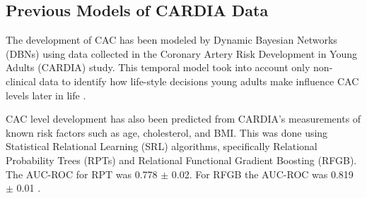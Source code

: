 \begin{comment}
Unlike BIC and AIC, BDe uses a Bayesian approach to scoring. This method was deveoped by Heckerman, Geiger, and Chickering in 1995 \cite{Heckerman1995}. 


In constraint based structure learning algorithms, the algorithms use conditional independence tests to detect the Markov blankets of the variables, which in turn are used to compute the structure of the Bayesian network. \cite{scutari2017package}  The constraint based learning algorithms that we used are incremental association, Semi-interleaved Hiton PC, and Chow Liu.  Incremental Association uses a two fold plan which starts with a fast forward selection process followed by an effort to eliminate false postives.\cite{scutari2017package} The Semi-interleaved Hiton Pc algorithm uses fast forward selection methods for neighbourhood detection created to eliminate nodes early built on the marginal association. \cite{scutari2017package}.  Where as the Chow Liu algorithm learns the tree structure closest to the true one in the probability table.\cite{scutari2017package} This is done by finding the weight likelihood for each edge, and creating the maximum weight spanning tree.\cite{Murphy}

\end{comment}

\subsection{Previous Models of CARDIA Data}
The development of CAC has been modeled by Dynamic Bayesian Networks (DBNs) using data collected in the Coronary Artery Risk Development in Young Adults (CARDIA) study. This temporal model took into account only non-clinical data to identify how life-style decisions young adults make influence CAC levels later in life \cite{Yang}.

CAC level development has also been predicted from CARDIA's measurements of known risk factors such as age, cholesterol, and BMI. This was done using Statistical Relational Learning (SRL) algorithms, specifically Relational Probability Trees (RPTs) and Relational Functional Gradient Boosting (RFGB). The AUC-ROC for RPT was 0.778 $\pm$ 0.02. For RFGB the AUC-ROC was 0.819 $\pm$ 0.01 \cite{Natarajan2013}. 




